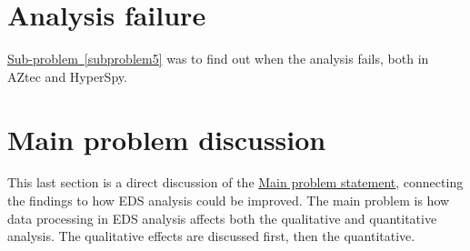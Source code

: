 




%
%




%
%
\section{Analysis failure}
\label{sec:discussion:failure}
\hyperref[subproblem5]{Sub-problem~\ref*{subproblem5}} was to find out when the analysis fails, both in AZtec and HyperSpy.






\section{Main problem discussion}
\label{sec:discussion:mainproblem}


This last section is a direct discussion of the \hyperref[mainproblem]{Main problem statement}, connecting the findings to how EDS analysis could be improved.
The main problem is how data processing in EDS analysis affects both the qualitative and quantitative analysis.
The qualitative effects are discussed first, then the quantitative.









